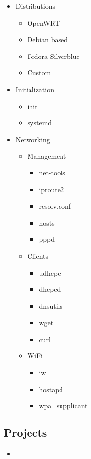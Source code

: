 \begin{itemize}
    \item Distributions
    \begin{itemize}
        \item OpenWRT
        \item Debian based
        \item Fedora Silverblue
        \item Custom
    \end{itemize}
    \item Initialization
    \begin{itemize}
        \item init
        \item systemd
    \end{itemize}
    \item Networking
    \begin{itemize}
        \item Management
        \begin{itemize}
            \item net-tools
            \item iproute2
            \item resolv.conf
            \item hosts
            \item pppd
        \end{itemize}

        \item Clients
        \begin{itemize}
            \item udhcpc
            \item dhcpcd
            \item dnsutils
            \item wget
            \item curl
        \end{itemize}

        \item WiFi
        \begin{itemize}
            \item iw
            \item hostapd
            \item wpa\_supplicant
        \end{itemize}

    \end{itemize}
\end{itemize}

\subsection{Projects}

\begin{itemize}
    \item \noprojects
\end{itemize}

\newpage
